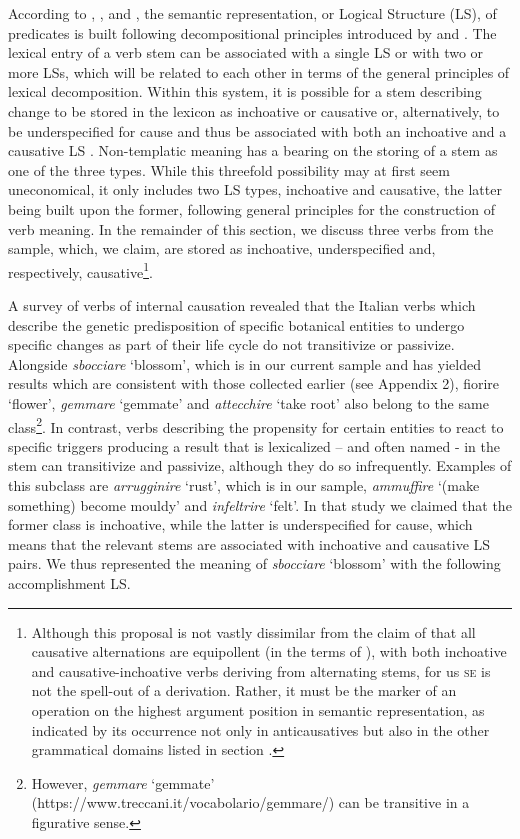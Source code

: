 \documentclass[output=paper,colorlinks,citecolor=brown
]{langscibook}
\begin{document}
According to \citet[82—129]{vanvalin1997syntax}, \citet[32—49]{vanvalin2005exploring}, and \citet[94—107]{vanvalin2023principles}, the semantic representation, or Logical Structure (LS), of predicates is built following decompositional principles introduced by \citet{vendler1967linguistics} and \citet{dowty1979word}. The lexical entry of a verb stem can be associated with a single LS or with two or more LSs, which will be related to each other in terms of the general principles of lexical decomposition. Within this system, it is possible for a stem describing change to be stored in the lexicon as inchoative or causative or, alternatively, to be underspecified for cause and thus be associated with both an inchoative and a causative LS \citep{brocher2017full}. Non-templatic meaning has a bearing on the storing of a stem as one of the three types. While this threefold possibility may at first seem uneconomical, it only includes two LS types, inchoative and causative, the latter being built upon the former, following general principles for the construction of verb meaning. In the remainder of this section, we discuss three verbs from the sample, which, we claim, are stored as inchoative, underspecified and, respectively, causative\footnote{Although this proposal is not vastly dissimilar from the claim of \citet{pinon2001finer} that all causative alternations are equipollent (in the terms of \cite{haspelmath1993more}), with both inchoative and causative-inchoative verbs deriving from alternating stems, for us \textsc{se} is not the spell-out of a derivation. Rather, it must be the marker of an operation on the highest argument position in semantic representation, as indicated by its occurrence not only in anticausatives but also in the other grammatical domains listed in section .}. 

A survey of verbs of internal causation \citep{bentley2023internally} revealed that the Italian verbs which describe the genetic predisposition of specific botanical entities to undergo specific changes as part of their life cycle do not transitivize or passivize. Alongside \textit{sbocciare} ‘blossom’, which is in our current sample and has yielded results which are consistent with those collected earlier (see Appendix 2), fiorire ‘flower’, \textit{gemmare} ‘gemmate’ and \textit{attecchire} ‘take root’ also belong to the same class\footnote{However, \textit{gemmare} ‘gemmate’ (https://www.treccani.it/vocabolario/gemmare/) can be transitive in a figurative sense.}.   In contrast, verbs describing the propensity for certain entities to react to specific triggers producing a result that is lexicalized – and often named - in the stem can transitivize and passivize, although they do so infrequently. Examples of this subclass are \textit{arrugginire} ‘rust’, which is in our sample, \textit{ammuffire} ‘(make something) become mouldy’ and \textit{infeltrire} ‘felt’. In that study we claimed that the former class is inchoative, while the latter is underspecified for cause, which means that the relevant stems are associated with inchoative and causative LS pairs. We thus represented the meaning of \textit{sbocciare} ‘blossom’ with the following accomplishment LS. 
\end{document}
